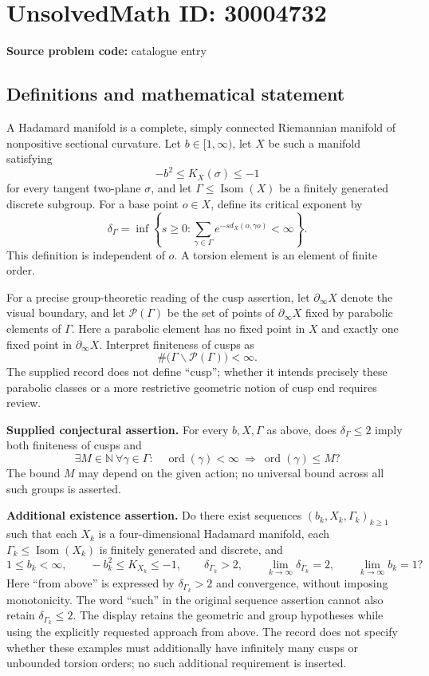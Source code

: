 \documentclass[11pt]{article}
\newcommand{\N}{\mathbb{N}}
\begin{document}
\section*{UnsolvedMath ID: 30004732}
\textbf{Source problem code:} catalogue entry
\subsection{Definitions and mathematical statement}
A Hadamard manifold is a complete, simply connected Riemannian manifold of nonpositive sectional curvature. Let $b\in[1,\infty)$, let $X$ be such a manifold satisfying
\[
-b^2\leq K_X(\sigma)\leq-1
\]
for every tangent two-plane $\sigma$, and let $\Gamma\leq\operatorname{Isom}(X)$ be a finitely generated discrete subgroup. For a base point $o\in X$, define its critical exponent by
\[
\delta_\Gamma=\inf\left\{s\geq0:\sum_{\gamma\in\Gamma}e^{-s d_X(o,\gamma o)}<\infty\right\}.
\]
This definition is independent of $o$. A torsion element is an element of finite order.

For a precise group-theoretic reading of the cusp assertion, let $\partial_\infty X$ denote the visual boundary, and let $\mathcal P(\Gamma)$ be the set of points of $\partial_\infty X$ fixed by parabolic elements of $\Gamma$. Here a parabolic element has no fixed point in $X$ and exactly one fixed point in $\partial_\infty X$. Interpret finiteness of cusps as
\[
\#\bigl(\Gamma\backslash\mathcal P(\Gamma)\bigr)<\infty.
\]
The supplied record does not define ``cusp''; whether it intends precisely these parabolic classes or a more restrictive geometric notion of cusp end requires review.

\textbf{Supplied conjectural assertion.} For every $b,X,\Gamma$ as above, does $\delta_\Gamma\leq2$ imply both finiteness of cusps and
\[
\exists M\in\N\ \forall\gamma\in\Gamma:\quad
\operatorname{ord}(\gamma)<\infty\ \Longrightarrow\ \operatorname{ord}(\gamma)\leq M?
\]
The bound $M$ may depend on the given action; no universal bound across all such groups is asserted.

\textbf{Additional existence assertion.} Do there exist sequences $(b_k,X_k,\Gamma_k)_{k\geq1}$ such that each $X_k$ is a four-dimensional Hadamard manifold, each $\Gamma_k\leq\operatorname{Isom}(X_k)$ is finitely generated and discrete, and
\[
1\leq b_k<\infty,\qquad
-b_k^2\leq K_{X_k}\leq-1,\qquad
\delta_{\Gamma_k}>2,\qquad
\lim_{k\to\infty}\delta_{\Gamma_k}=2,\qquad
\lim_{k\to\infty}b_k=1?
\]
Here ``from above'' is expressed by $\delta_{\Gamma_k}>2$ and convergence, without imposing monotonicity. The word ``such'' in the original sequence assertion cannot also retain $\delta_{\Gamma_k}\leq2$. The display retains the geometric and group hypotheses while using the explicitly requested approach from above. The record does not specify whether these examples must additionally have infinitely many cusps or unbounded torsion orders; no such additional requirement is inserted.
\end{document}
